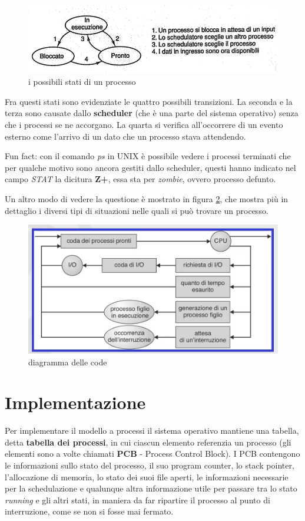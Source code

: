 \begin{figure}[H]
    \centering
    \includegraphics[width=0.6\linewidth]{assets/stati3.png}
    \caption{i possibili stati di un processo}
    \label{stati3}
  \end{figure}

  Fra questi stati sono evidenziate le quattro possibili transizioni. La seconda e la terza sono causate dallo \textbf{scheduler} (che è una parte del sistema operativo) senza che i processi se ne accorgano.
  La quarta si verifica all'occorrere di un evento esterno come l'arrivo di un dato che un processo stava attendendo.

  Fun fact: con il comando \textit{ps} in UNIX è possibile vedere i processi terminati che per qualche motivo sono ancora gestiti dallo scheduler, questi hanno indicato nel campo \textit{STAT} la dicitura \textbf{Z+}, essa sta per \textit{zombie}, ovvero processo defunto.

  Un altro modo di vedere la questione è mostrato in figura \ref{code3}, che mostra più in dettaglio i diversi tipi di situazioni nelle quali si può trovare un processo.

  \begin{figure}[H]
    \centering
    \includegraphics[width=0.7\linewidth]{assets/code3.png}
    \caption{diagramma delle code}
    \label{code3}
  \end{figure}

  \section{Implementazione}
  Per implementare il modello a processi il sistema operativo mantiene una tabella, detta \textbf{tabella dei processi}, in cui ciascun elemento referenzia un processo (gli elementi sono a volte chiamati \textbf{PCB} - Process Control Block). I PCB contengono le informazioni sullo stato del processo, il suo program counter, lo stack pointer, l'allocazione di memoria, lo stato dei suoi file aperti, le informazioni necessarie per la schedulazione e qualunque altra informazione utile per passare tra lo stato \textit{running} e gli altri stati, in maniera da far ripartire il processo al punto di interruzione, come se non si fosse mai fermato.

